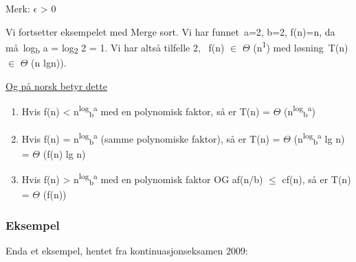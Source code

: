 \documentclass[12pt]{report}
\begin{document}


\vspace{\baselineskip}
\setlength{\parskip}{0.0pt}
Merk: $ \epsilon $  > 0\par


\vspace{\baselineskip}
Vi fortsetter eksempelet med Merge sort. Vi har funnet a=2, b=2, f(n)=n, da må log\textsubscript{b} a = log\textsubscript{2} 2 = 1. Vi har altså tilfelle 2,  f(n) $ \in $  $ \Theta $ (n\textsuperscript{1}) med løsning T(n)$ \in $ $ \Theta $ (n lgn)).\par


\vspace{\baselineskip}

\vspace{\baselineskip}



\newpage

\vspace{\baselineskip}\uline{Og på norsk betyr dette }\par

\begin{enumerate}
	\item Hvis f(n) < n\textsuperscript{log}\textsubscript{b}\textsuperscript{a }med en polynomisk faktor, så er T(n) = $ \Theta $ (n\textsuperscript{log}\textsubscript{b}\textsuperscript{a})\par

	\item Hvis f(n) = n\textsuperscript{log}\textsubscript{b}\textsuperscript{a } (samme polynomiske faktor), så er T(n) = $ \Theta $ (n\textsuperscript{log}\textsubscript{b}\textsuperscript{a} lg n) = $ \Theta $ (f(n) lg n)\par

	\item Hvis f(n) > n\textsuperscript{log}\textsubscript{b}\textsuperscript{a }med en polynomisk faktor OG af(n/b) $ \leq $  cf(n), så er T(n) = $ \Theta $ (f(n))
\end{enumerate}\par


\vspace{\baselineskip}
\setlength{\parskip}{6.0pt}
\subsubsection*{Eksempel}
\setlength{\parskip}{10.56pt}
Enda et eksempel, hentet fra kontinuasjonseksamen 2009:\par
\end{document}

